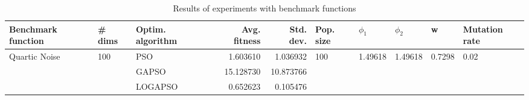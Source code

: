 \begin{table}
\centering
\caption{Results of experiments with benchmark functions}
\begin{tabular}{lllrrlllll}
\toprule
            Benchmark function &              \# dims & Optim. algorithm &  Avg. fitness &  Std. dev. &            Pop. size &               $\phi_{1}$ &               $\phi_{2}$ &                       w &         Mutation rate \\
\midrule
\multirow{3}{*}{Quartic Noise} & \multirow{3}{*}{100} &              PSO &      1.603610 &   1.036932 & \multirow{3}{*}{100} & \multirow{3}{*}{1.49618} & \multirow{3}{*}{1.49618} & \multirow{3}{*}{0.7298} & \multirow{3}{*}{0.02} \\
                               &                      &            GAPSO &     15.128730 &  10.873766 &                      &                          &                          &                         &                       \\
                               &                      &          LOGAPSO &      0.652623 &   0.105476 &                      &                          &                          &                         &                       \\
\bottomrule
\end{tabular}
\end{table}
